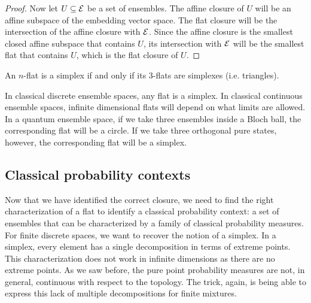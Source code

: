\begin{mathSection}
\begin{proof}
		Now let $U \subseteq \mathcal{E}$ be a set of ensembles. The affine closure of $U$ will be an affine subspace of the embedding vector space. The flat closure will be the intersection of the affine closure with $\mathcal{E}$. Since the affine closure is the smallest closed affine subspace that contains $U$, its intersection with $\mathcal{E}$ will be the smallest flat that contains $U$, which is the flat closure of $U$.
	\end{proof}
	
	\begin{conj}
		An $n$-flat is a simplex if and only if its $3$-flats are simplexes (i.e. triangles).
	\end{conj}
	
	\begin{remark}
		In classical discrete ensemble spaces, any flat is a simplex. In classical continuous ensemble spaces, infinite dimensional flats will depend on what limits are allowed. In a quantum ensemble space, if we take three ensembles inside a Bloch ball, the corresponding flat will be a circle. If we take three orthogonal pure states, however, the corresponding flat will be a simplex.
	\end{remark}
\end{mathSection}

\subsection{Classical probability contexts}

Now that we have identified the correct closure, we need to find the right characterization of a flat to identify a classical probability context: a set of ensembles that can be characterized by a family of classical probability measures. For finite discrete spaces, we want to recover the notion of a simplex. In a simplex, every element has a single decomposition in terms of extreme points. This characterization does not work in infinite dimensions as there are no extreme points. As we saw before, the pure point probability measures are not, in general, continuous with respect to the topology. The trick, again, is being able to express this lack of multiple decompositions for finite mixtures.


